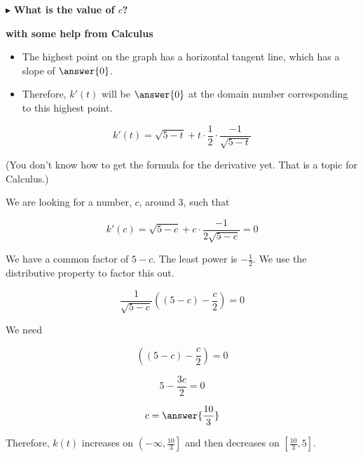 \documentclass{ximera}
\begin{document}
$\blacktriangleright$ \textbf{\textcolor{blue!55!black}{What is the value of $c$?}} 

\begin{explanation} \textbf{\textcolor{red!75!green}{with some help from Calculus}} 


\begin{itemize}
\item The highest point on the graph has a horizontal tangent line, which has a slope of $\answer{0}$.  
\item Therefore, $k'(t)$ will be $\answer{0}$ at the domain number corresponding to this highest point.
\end{itemize}




\[   k'(t) = \sqrt{5-t} + t \cdot \frac{1}{2} \cdot \frac{-1}{\sqrt{5-t}}    \]

(You don't know how to get the formula for the derivative yet.  That is a topic for Calculus.)

We are looking for a number, $c$, around $3$, such that 


\[   k'(c) = \sqrt{5-c} + c \cdot \frac{-1}{2 \sqrt{5-c}}  = 0  \]

We have a common factor of $5-c$.  The least power is $-\frac{1}{2}$.  We use the distributive property to factor this out.


\[  \frac{1}{\sqrt{5-c}} \left( (5-c) - \frac{c}{2} \right) = 0  \]




We need 


\[  \left( (5-c) - \frac{c}{2} \right) = 0  \]

\[  5 - \frac{3c}{2}  = 0  \]


\[  c = \answer{\frac{10}{3}}  \]


\end{explanation}


Therefore, $k(t)$ increases on $\left(-\infty, \frac{10}{3}\right]$ and then decreases on $\left[\frac{10}{3},5\right]$.
\end{document}
